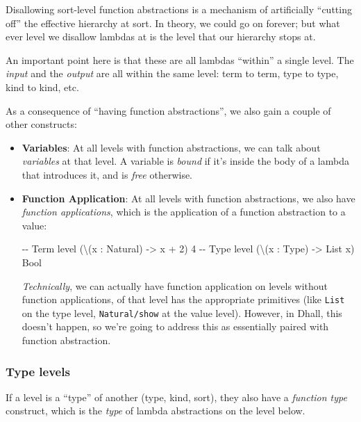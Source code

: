\documentclass[]{article}
\newenvironment{Shaded}{}{}
\newcommand{\NormalTok}[1]{#1}
\begin{document}
Disallowing sort-level function abstractions is a mechanism of artificially
``cutting off'' the effective hierarchy at sort. In theory, we could go on
forever; but what ever level we disallow lambdas at is the level that our
hierarchy stops at.

An important point here is that these are all lambdas ``within'' a single level.
The \emph{input} and the \emph{output} are all within the same level: term to
term, type to type, kind to kind, etc.

As a consequence of ``having function abstractions'', we also gain a couple of
other constructs:

\begin{itemize}
\item
  \textbf{Variables}: At all levels with function abstractions, we can talk
  about \emph{variables} at that level. A variable is \emph{bound} if it's
  inside the body of a lambda that introduces it, and is \emph{free} otherwise.
\item
  \textbf{Function Application}: At all levels with function abstractions, we
  also have \emph{function applications}, which is the application of a function
  abstraction to a value:

\begin{Shaded}
\begin{Highlighting}[]
\NormalTok{{-}{-} Term level}
\NormalTok{(\textbackslash{}(x : Natural) {-}\textgreater{} x + 2) 4}
\NormalTok{{-}{-} Type level}
\NormalTok{(\textbackslash{}(x : Type) {-}\textgreater{} List x) Bool}
\end{Highlighting}
\end{Shaded}

  \emph{Technically}, we can actually have function application on levels
  without function applications, of that level has the appropriate primitives
  (like \texttt{List} on the type level, \texttt{Natural/show} at the value
  level). However, in Dhall, this doesn't happen, so we're going to address this
  as essentially paired with function abstraction.
\end{itemize}

\subsubsection{Type levels}\label{type-levels}

If a level is a ``type'' of another (type, kind, sort), they also have a
\emph{function type} construct, which is the \emph{type} of lambda abstractions
on the level below.
\end{document}
